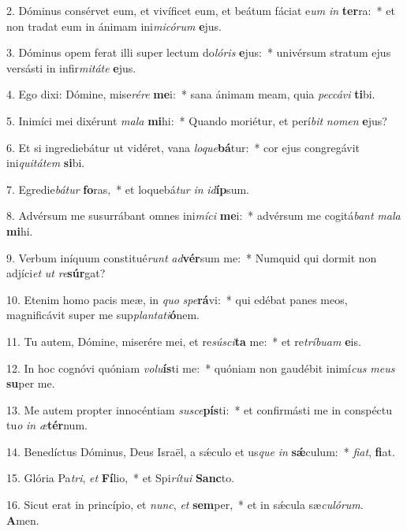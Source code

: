 2. Dóminus consérvet eum, et vivíficet eum, et beátum fáciat e\textit{um} \textit{in} \textbf{ter}ra:~*  et non tradat eum in ánimam ini\textit{mi}\textit{có}\textit{rum} \textbf{e}jus.\

3. Dóminus opem ferat illi super lectum do\textit{ló}\textit{ris} \textbf{e}jus:~*  univérsum stratum ejus versásti in infir\textit{mi}\textit{tá}\textit{te} \textbf{e}jus.\

4. Ego dixi: Dómine, mise\textit{ré}\textit{re} \textbf{me}i:~*  sana ánimam meam, quia \textit{pec}\textit{cá}\textit{vi} \textbf{ti}bi.\

5. Inimíci mei dixérunt \textit{ma}\textit{la} \textbf{mi}hi:~*  Quando moriétur, et perí\textit{bit} \textit{no}\textit{men} \textbf{e}jus?\

6. Et si ingrediebátur ut vidéret, vana \textit{lo}\textit{que}\textbf{bá}tur:~*  cor ejus congregávit ini\textit{qui}\textit{tá}\textit{tem} \textbf{si}bi.\

7. Egredie\textit{bá}\textit{tur} \textbf{fo}ras,~*  et loquebá\textit{tur} \textit{in} \textit{id}\textbf{íp}sum.\

8. Advérsum me susurrábant omnes ini\textit{mí}\textit{ci} \textbf{me}i:~*  advérsum me cogitá\textit{bant} \textit{ma}\textit{la} \textbf{mi}hi.\

9. Verbum iníquum constitué\textit{runt} \textit{ad}\textbf{vér}sum me:~*  Numquid qui dormit non adjíci\textit{et} \textit{ut} \textit{re}\textbf{súr}gat?\

10. Etenim homo pacis meæ, in \textit{quo} \textit{spe}\textbf{rá}vi:~*  qui edébat panes meos, magnificávit super me sup\textit{plan}\textit{ta}\textit{ti}\textbf{ó}nem.\

11. Tu autem, Dómine, miserére mei, et re\textit{sú}\textit{sci}\textbf{ta} me:~*  et re\textit{trí}\textit{bu}\textit{am} \textbf{e}is.\

12. In hoc cognóvi quóniam \textit{vo}\textit{lu}\textbf{ís}ti me:~*  quóniam non gaudébit inimí\textit{cus} \textit{me}\textit{us} \textbf{su}per me.\

13. Me autem propter innocéntiam \textit{su}\textit{sce}\textbf{pís}ti:~*  et confirmásti me in conspéctu tu\textit{o} \textit{in} \textit{æ}\textbf{tér}num.\

14. Benedíctus Dóminus, Deus Israël, a sǽculo et us\textit{que} \textit{in} \textbf{sǽ}culum:~*  \textit{fi}\textit{at}, \textbf{fi}at.\

15. Glória Pa\textit{tri}, \textit{et} \textbf{Fí}lio,~*  et Spi\textit{rí}\textit{tu}\textit{i} \textbf{Sanc}to.\

16. Sicut erat in princípio, et \textit{nunc}, \textit{et} \textbf{sem}per,~*  et in sǽcula sæ\textit{cu}\textit{ló}\textit{rum}. \textbf{A}men.\

